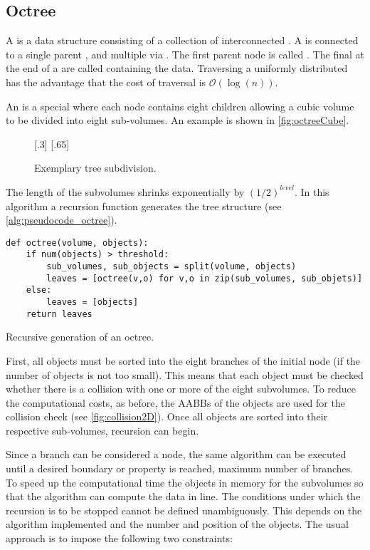 \subsection{Octree}\label{sec:octree}
%
A  is a data structure consisting of a collection of interconnected  .
A  is connected to a single parent , and multiple  via .
The first parent node is called .
The final  at the end of a  are called  containing the data.
Traversing a uniformly distributed  has the advantage that the cost of traversal is $\mathcal{O}(\log(n))$.
\par
%
An  is a special  where each node contains eight children allowing a cubic volume to be divided into eight sub-volumes.
An example is shown in \cref{fig:octreeCube}.
% 
\begin{figure}[!t]
    \centering
    [.3\textwidth]{
    \def\tikzheight{0.6\textwidth}
    }
    \hfill
    [.65\textwidth]{
    \def\tikzheight{0.6\textwidth}
    }
	\caption{Exemplary tree subdivision.}
	\label{fig:octree}
\end{figure}
% 
The length of the subvolumes shrinks exponentially by $(1/2)^\mathit{level}$.
In this algorithm a recursion function  generates the tree structure (see \cref{alg:pseudocode_octree}).
\par
%
\begin{lstfloat}[!tb]
\lstset{style=python}
\begin{lstlisting}[]
def octree(volume, objects):
    if num(objects) > threshold:
        sub_volumes, sub_objects = split(volume, objects)
        leaves = [octree(v,o) for v,o in zip(sub_volumes, sub_objets)]
    else:
        leaves = [objects]
    return leaves
\end{lstlisting}
\caption{Recursive generation of an octree.}
\label{alg:pseudocode_octree}
\end{lstfloat}
%
First, all objects must be sorted into the eight branches of the initial node (if the number of objects is not too small). This means that each object must be checked whether there is a collision with one or more of the eight subvolumes.
To reduce the computational costs, as before, the \acp{AABB} of the objects are used for the collision check (see \cref{fig:collision2D}).
Once all objects are sorted into their respective sub-volumes, recursion can begin.
\par
% 
Since a branch can be considered a node, the same algorithm can be executed until a desired boundary or property is reached, \eg{} maximum number of branches.
To speed up the computational time the objects in memory for the subvolumes so that the algorithm can compute the data in line.
The conditions under which the recursion is to be stopped cannot be defined unambiguously.
This depends on the algorithm implemented and the number and position of the objects.
The usual approach is to impose the following two constraints:
%
